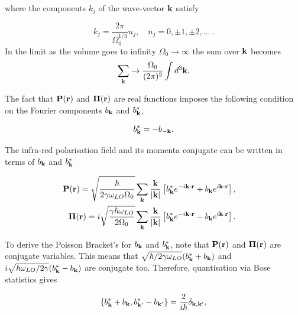 where the components $k_j$ of the wave-vector $\vb{k}$ satisfy

\begin{equation}
    k_j = \frac{2\pi}{\Omega_0^{1/3}} n_j, \quad n_j = 0, \pm 1, \pm 2, \dots \ .
\end{equation}
In the limit as the volume goes to infinity $\Omega_0 \to \infty$ the sum over $\vb{k}$ becomes
\begin{equation}
    \sum_{\vb{k}} \rightarrow \frac{\Omega_0}{(2\pi)^3} \int d^3 \vb{k}.
\end{equation}

The fact that $\vb{P}(\vb{r})$ and $\vb{\Pi}(\vb{r})$ are real functions imposes the following condition on the Fourier components $b_{\vb{k}}$ and $b^*_{\vb{k}}$,

\begin{equation}
    b^*_{\vb{k}} = -b_{-\vb{k}}.
\end{equation}

The infra-red polarisation field and its momenta conjugate can be written in terms of $b_{\vb{k}}$ and $b^*_{\vb{k}}$ 

\begin{subequations}
\begin{align}
    \begin{split}
        \vb{P}(\vb{r}) &= \sqrt{\frac{\hbar}{2\gamma\omega_{LO}\Omega_0}} \sum_{\vb{k}} \frac{\vb{k}}{\abs{\vb{k}}} \left[b^*_{\vb{k}}e^{-i\vb{k}\cdot\vb{r}} + b_{\vb{k}} e^{i\vb{k}\cdot\vb{r}}\right],
    \end{split}\\
    \begin{split}
        \vb{\Pi}(\vb{r}) &= i\sqrt{\frac{\gamma\hbar\omega_{LO}}{2\Omega_0}} \sum_{\vb{k}} \frac{\vb{k}}{\abs{\vb{k}}} \left[b^*_{\vb{k}}e^{-i\vb{k}\cdot\vb{r}} - b_{\vb{k}} e^{i\vb{k}\cdot\vb{r}}\right].
    \end{split}
\end{align}
\end{subequations}

To derive the Poisson Bracket's for $b_{\vb{k}}$ and $b_{\vb{k}}^*$, note that $\vb{P}(\vb{r})$ and $\vb{\Pi}(\vb{r})$ are conjugate variables. This means that $\sqrt{\hbar / 2\gamma \omega_{LO}} (b_{\vb{k}}^* + b_{\vb{k}})$ and  $i\sqrt{\hbar \omega_{LO} / 2\gamma} (b_{\vb{k}}^* - b_{\vb{k}})$ are conjugate too. Therefore, quantisation via Bose statistics gives

\begin{equation}
    \left\{b_{\vb{k}}^* + b_{\vb{k}}, b_{\vb{k'}}^* - b_{\vb{k'}}\right\} = \frac{2}{i\hbar} \delta_{\vb{k}, \vb{k'}},
\end{equation}

